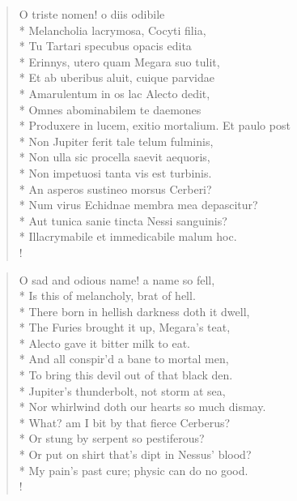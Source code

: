 \begin{latin}%
\begin{verse}%
O triste nomen! o diis odibile\\*
Melancholia lacrymosa, Cocyti filia,\\*
Tu Tartari specubus opacis edita\\*
Erinnys, utero quam Megara suo tulit,\\*
Et ab uberibus aluit, cuique parvidae\\*
Amarulentum in os lac Alecto dedit,\\*
Omnes abominabilem te daemones\\*
Produxere in lucem, exitio mortalium. Et paulo post\\*
Non Jupiter ferit tale telum fulminis,\\*
Non ulla sic procella saevit aequoris,\\*
Non impetuosi tanta vis est turbinis.\\*
An asperos sustineo morsus Cerberi?\\*
Num virus Echidnae membra mea depascitur?\\*
Aut tunica sanie tincta Nessi sanguinis?\\*
Illacrymabile et immedicabile malum hoc.\\!
\end{verse}%
\end{latin}%
\translationrule%
\begin{verse}%
O sad and odious name! a name so fell,\\*
Is this of melancholy, brat of hell.\\*
There born in hellish darkness doth it dwell,\\*
The Furies brought it up, Megara's teat,\\*
Alecto gave it bitter milk to eat.\\*
And all conspir'd a bane to mortal men,\\*
To bring this devil out of that black den.\\*
Jupiter's thunderbolt, not storm at sea,\\*
Nor whirlwind doth our hearts so much dismay.\\*
What? am I bit by that fierce Cerberus?\\*
Or stung by serpent so pestiferous?\\*
Or put on shirt that's dipt in Nessus' blood?\\*
My pain's past cure; physic can do no good.\\!
\end{verse}%
%

